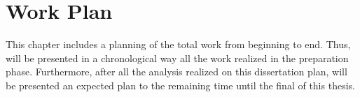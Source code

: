 \chapter{Work Plan}
\label{cha:work_plan}
This chapter includes a planning of the total work from beginning to end. Thus, will be presented in a chronological way all the work realized in the preparation phase. Furthermore, after all the analysis realized on this dissertation plan, will be presented an expected plan to the remaining time until the final of this thesis.
